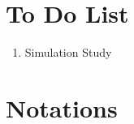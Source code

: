\documentclass[preprint,12pt]{elsarticle}
\begin{document}
\begin{frontmatter}





\end{frontmatter}

\linenumbers
\section{To Do List}
\begin{enumerate}
    \item Simulation Study
\end{enumerate}
\section{Notations}
\printunsrtglossary[type=symbols,style=long, title = {List of Notations}]
\end{document}
